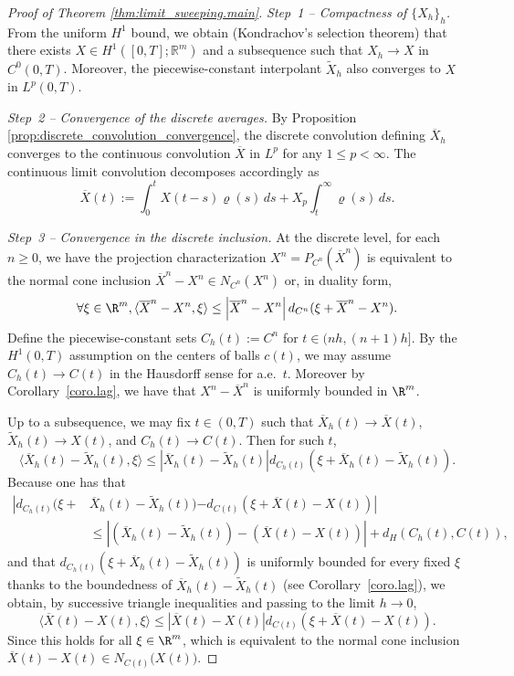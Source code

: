 \documentclass[]{jnsao}
\begin{document}
 
 \begin{proof}[Proof of Theorem \ref{thm:limit_sweeping.main}]
 	\emph{Step~1 -- Compactness of $\{X_h\}_h$.}
 	From the uniform $H^1$ bound, we obtain (Kondrachov’s selection theorem) that there exists
 	$X\in H^1([0,T];\mathbb R^m)$ and a subsequence such that
 	$X_h\to X$ in $C^0(0,T)$.
	Moreover, the piecewise-constant interpolant $\tilde{X}_h$ also converges to $X$ in $L^p(0,T)$.
 	
 	\emph{Step~2 -- Convergence of the discrete averages.}
	By Proposition \ref{prop:discrete_convolution_convergence}, 
	the discrete convolution defining $\overline{X}_h$ converges to the continuous convolution $\overline{X}$
	in $L^p$ for any $1\le p<\infty$. The continuous limit convolution decomposes accordingly as
 	\[
 	\overline{X}(t)
 	:=\int_0^t X(t-s)\varrho(s)\,ds
 	+ X_p \int_t^\infty \varrho(s)\,ds.
 	\]
 	
 	\emph{Step~3 -- Convergence in the discrete inclusion.}
 	At the discrete level, for each $n\ge0$, we have the projection characterization $
 	X^n = P_{C^n}(\overline{X}^n) $ is equivalent to the normal cone inclusion
 	$\overline{X}^n - X^n \in N_{C^n}(X^n)$ or, in duality form,
 	\[
	\forall \xi \in \R^m, \langle \overline{X}^n - X^n , \xi \rangle \leq \left| \overline{X}^n - X^n \right| d_{C^n}(\xi + \overline{X}^n - X^n).
 	\]
 	Define the piecewise-constant sets $C_h(t):=C^n$ for $t\in(nh,(n+1)h]$.
 	By the $H^1(0,T)$ assumption on the centers of balls  $c(t)$,
 	we may assume $C_h(t)\to C(t)$ in the Hausdorff sense for a.e.\ $t$.
 	Moreover by Corollary~\ref{coro.lag}, we have that $X^n-\overline{X}^n$ is uniformly bounded in $\R^m$.

	Up to a subsequence, we may fix $t\in(0,T)$ such that
 	$\overline{X}_h(t)\to \overline{X}(t)$, $\tilde{X}_h(t)\to X(t)$,
 	and $C_h(t)\to C(t)$.
 	Then for such $t$,
 	\[
 	\langle \overline{X}_h(t) - \tilde{X}_h(t) , \xi \rangle 
 	\leq \left| \overline{X}_h(t) - \tilde{X}_h(t) \right| d_{C_h(t)}(\xi + \overline{X}_h(t) - \tilde{X}_h(t)).
 	\]
	Because one has that 
	$$
	\begin{aligned}
		\left| d_{C_h(t)} (\xi + \right. & \overline{X}_h(t)- \tilde{X}_h(t))  \left.- d_{C(t)}(\xi + \overline{X}(t) - X(t))\right| \\
	& \leq \left| (\overline{X}_h(t) - \tilde{X}_h(t))- (\overline{X}(t) - X(t)) \right| + d_H(C_h(t),C(t)),
	\end{aligned}
	$$
	and that $d_{C_h(t)} (\xi + \overline{X}_h(t) - \tilde{X}_h(t))$ is uniformly bounded for every fixed $\xi$ 
	thanks to the boundedness of $\overline{X}_h(t) - \tilde{X}_h(t)$ (see Corollary~\ref{coro.lag}),
 	we obtain, by successive triangle inequalities and passing to the limit $h\to0$,
 	\[
 	\langle \overline{X}(t) - X(t) , \xi \rangle 
 	\leq \left| \overline{X}(t) - X(t) \right| d_{C(t)}(\xi + \overline{X}(t) - X(t)).
 	\]
 	Since this holds for all $\xi\in\R^m$, which is equivalent to the normal cone inclusion
 	$
 	\overline{X}(t)-X(t)\in N_{C(t)}\big(X(t)\big)
 	$.	
 \end{proof}
 
\end{document}
